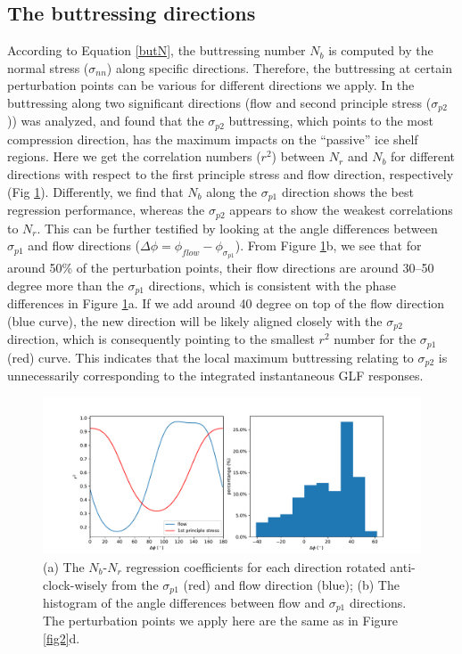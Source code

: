 \documentclass[review,oneside]{igs}
\begin{document}
\subsection{The buttressing directions}
According to Equation \ref{butN}, the buttressing number $N_b$ is computed by the normal stress ($\sigma_{nn}$) along specific directions. Therefore, the buttressing at certain perturbation points can be various for different directions we apply. In \cite{furst2016} the buttressing along two significant directions (flow and second principle stress ($\sigma_{p2}$)) was analyzed, and found that the $\sigma_{p2}$ buttressing, which points to the most compression direction, has the maximum impacts on the ``passive'' ice shelf regions. Here we get the correlation numbers ($r^2$) between $N_r$ and $N_b$ for different directions with respect to the first principle stress and flow direction, respectively (Fig \ref{fig3}). Differently, we find that $N_b$ along the $\sigma_{p1}$ direction shows the best regression performance, whereas the $\sigma_{p2}$ appears to show the weakest correlations to $N_r$. This can be further testified by looking at the angle differences between $\sigma_{p1}$ and flow directions ($\Delta \phi = \phi_{flow}-\phi_{\sigma_{p1}}$). From Figure \ref{fig3}b, we see that for around 50\% of the perturbation points, their flow directions are around 30--50 degree more than the $\sigma_{p1}$ directions, which is consistent with the phase differences in Figure \ref{fig3}a. If we add around 40 degree on top of the flow direction (blue curve), the new direction will be likely aligned closely with the $\sigma_{p2}$ direction, which is consequently pointing to the smallest $r^2$ number for the $\sigma_{p1}$ (red) curve. This indicates that the local maximum buttressing relating to $\sigma_{p2}$ is unnecessarily corresponding to the integrated instantaneous GLF responses.

\begin{figure}
\centering
\includegraphics[width=1\linewidth]{figs/fig3.pdf}
    \caption{(a) The $N_b$-$N_r$ regression coefficients for each direction rotated anti-clock-wisely from the $\sigma_{p1}$ (red) and flow direction (blue); (b) The histogram of the angle differences between flow and $\sigma_{p1}$ directions. The perturbation points we apply here are the same as in Figure \ref{fig2}d.}
    \label{fig3}
\end{figure}
\end{document}
